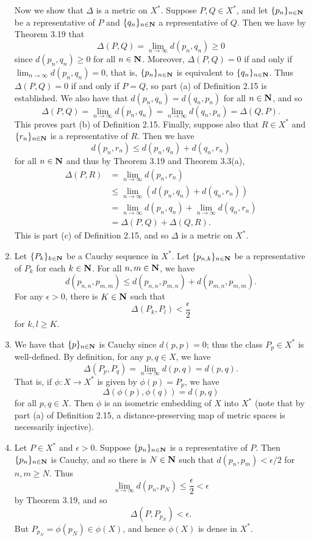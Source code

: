 \begin{ex}
\begin{enumerate}
Now we show that $\Delta$ is a metric on $X^*$. Suppose $P, Q \in X^*$, and let $\{p_n\}_{n \in \mathbf{N}}$ be a representative of $P$ and $\{q_n\}_{n \in \mathbf{N}}$ a representative of $Q$. Then we have by Theorem 3.19 that \[\Delta(P, Q) = \lim_{n\to\infty}d(p_n, q_n) \geq 0\] since $d(p_n, q_n) \geq 0$ for all $n \in \mathbf{N}$. Moreover, $\Delta(P, Q) = 0$ if and only if $\lim_{n\to\infty}d(p_n, q_n) = 0$, that is, $\{p_n\}_{n \in \mathbf{N}}$ is equivalent to $\{q_n\}_{n \in \mathbf{N}}$. Thus $\Delta(P, Q) = 0$ if and only if $P = Q$, so part (a) of Definition 2.15 is established. We also have that $d(p_n, q_n) = d(q_n, p_n)$ for all $n \in \mathbf{N}$, and so \[\Delta(P, Q) = \lim_{n\to\infty}d(p_n, q_n) = \lim_{n\to\infty}d(q_n, p_n) = \Delta(Q, P).\] This proves part (b) of Definition 2.15. Finally, suppose also that $R \in X^*$ and $\{r_n\}_{n \in \mathbf{N}}$ is a representative of $R$. Then we have \[d(p_n, r_n) \leq d(p_n, q_n) + d(q_n, r_n)\] for all $n \in \mathbf{N}$ and thus by Theorem 3.19 and Theorem 3.3(a),
\begin{align*}
\Delta(P, R) & = \lim_{n\to\infty}d(p_n, r_n)\\
& \leq \lim_{n\to\infty}(d(p_n, q_n) + d(q_n, r_n))\\
& = \lim_{n\to\infty}d(p_n, q_n) + \lim_{n\to\infty}d(q_n, r_n)\\
& = \Delta(P, Q) + \Delta(Q, R).
\end{align*}
This is part (c) of Definition 2.15, and so $\Delta$ is a metric on $X^*$.

\item Let $\{P_k\}_{k \in \mathbf{N}}$ be a Cauchy sequence in $X^*$. Let $\{p_{n, k}\}_{n \in \mathbf{N}}$ be a representative of $P_k$ for each $k \in \mathbf{N}$. For all $n, m \in \mathbf{N}$, we have \[d(p_{n, n}, p_{m, m}) \leq d(p_{n, n}, p_{m, n}) + d(p_{m, n}, p_{m ,m}).\] For any $\epsilon > 0$, there is $K \in \mathbf{N}$ such that \[\Delta(P_k, P_l) < \frac{\epsilon}{2}\] for $k, l \geq K$. 

\item We have that $\{p\}_{n \in \mathbf{N}}$ is Cauchy since $d(p, p) = 0$; thus the class $P_p \in X^*$ is well-defined. By definition, for any $p, q \in X$, we have \[\Delta(P_p, P_q) = \lim_{n\to\infty}d(p, q) = d(p, q).\] That is, if $\phi: X \to X^*$ is given by $\phi(p) = P_p$, we have \[\Delta(\phi(p), \phi(q)) = d(p, q)\] for all $p, q \in X$. Then $\phi$ is an isometric embedding of $X$ into $X^*$ (note that by part (a) of Definition 2.15, a distance-preserving map of metric spaces is necessarily injective).

\item Let $P \in X^*$ and $\epsilon > 0$. Suppose $\{p_n\}_{n \in \mathbf{N}}$ is a representative of $P$. Then $\{p_n\}_{n \in \mathbf{N}}$ is Cauchy, and so there is $N \in \mathbf{N}$ such that $d(p_n, p_m) < \epsilon/2$ for $n, m \geq N$. Thus \[\lim_{n\to\infty}d(p_n, p_N) \leq \frac{\epsilon}{2} < \epsilon\] by Theorem 3.19, and so \[\Delta(P, P_{p_N}) < \epsilon.\] But $P_{p_N} = \phi(p_N) \in \phi(X)$, and hence $\phi(X)$ is dense in $X^*$.


\end{enumerate}
\end{ex}
